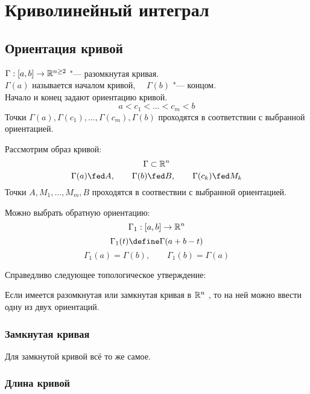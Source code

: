 \chapter{Криволинейный интеграл}

\section{Ориентация кривой}

\begin{definition}
	$ \Gamma : [a, b] \to \mathbb{R}^{n \ge 2} $ "--- разомкнутая кривая. \\
	$ \Gamma(a) $ называется началом кривой, $ \quad \Gamma(b) $ "--- концом. \\
	Начало и конец задают ориентацию кривой.
	$$ a < c_1 < \dots < c_m < b $$
	Точки $ \Gamma(a), \Gamma(c_1), \dots, \Gamma(c_m), \Gamma(b) $ проходятся в соответствии с выбранной ориентацией.
\end{definition}

Рассмотрим образ кривой:
$$ \Gamma \subset \mathbb{R}^n $$
$$ \Gamma(a) \fed A, \qquad \Gamma(b) \fed B, \qquad \Gamma(c_k) \fed M_k $$
Точки $ A, M_1, \dots, M_m, B $ проходятся в соотвествии с выбранной ориентацией.

Можно выбрать \soc обратную ориентацию:
$$ \Gamma_1 : [a, b] \to \mathbb{R}^n $$
$$ \Gamma_1(t) \define \Gamma(a + b - t) $$
$$ \Gamma_1(a) = \Gamma(b), \qquad \Gamma_1(b) = \Gamma(a) $$

Справедливо следующее топологическое утверждение:

\begin{theorem}
	Если имеется разомкнутая или замкнутая кривая в $ \mathbb{R}^n $ , то на ней можно ввести одну из двух ориентаций.
\end{theorem}

\begin{noproof}

\end{noproof}

\subsection{Замкнутая кривая}

Для замкнутой кривой всё то же самое.

\subsection{Длина кривой}

